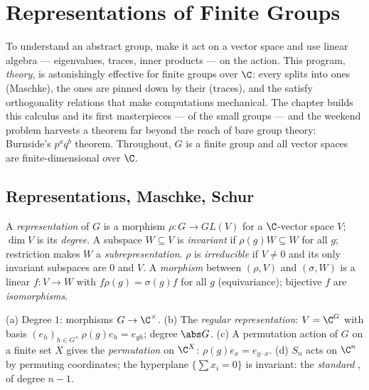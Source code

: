 \chapter{Representations of Finite Groups}\label{ch:b3:representations}

To understand an abstract group, make it act on a vector space
and use linear algebra --- eigenvalues, traces, inner products ---
on the action. This program, \emph{ theory}, is
astonishingly effective for finite groups over $\C$: every
 splits into  ones (Maschke), the
 ones are pinned down by their \emph{}
(traces), and the  satisfy orthogonality relations that
make computations mechanical. The chapter builds this calculus
and its first masterpieces ---  of the small
groups --- and the weekend problem harvests a theorem far beyond
the reach of bare group theory: Burnside's $p^aq^b$ theorem.
Throughout, $G$ is a finite group and all vector spaces are
finite-dimensional over $\C$.

\section{Representations, Maschke, Schur}

\begin{definition}\label{def:b3:representations:rep}
A \emph{representation} of $G$ is a
morphism $\rho \colon G \to GL(V)$ for a $\C$-vector space $V$;
$\dim V$ is its \emph{degree}. A subspace $W \subseteq V$ is
\emph{invariant} if $\rho(g)W \subseteq W$ for all $g$;
restriction makes $W$ a \emph{subrepresentation}. $\rho$ is
\emph{irreducible} if $V \neq
0$ and its only invariant subspaces are $0$ and $V$. A
\emph{morphism} between $(\rho, V)$ and $(\sigma, W)$ is a linear
$f\colon V \to W$ with $f\rho(g) = \sigma(g)f$ for all $g$
(equivariance); bijective $f$ are \emph{isomorphisms}.
\end{definition}

\begin{example}\label{ex:b3:representations:examples}
(a) Degree $1$: morphisms $G \to \C^\times$.
(b) The \emph{regular representation}: $V = \C^G$ with basis $(e_h)_{h \in G}$,
$\rho(g)e_h = e_{gh}$; degree $\abs G$.
(c) A permutation action of $G$ on a finite set $X$ gives the
\emph{permutation } on $\C^X$: $\rho(g)e_x =
e_{g\cdot x}$.
(d) $S_n$ acts on $\C^n$ by permuting coordinates; the hyperplane
$\{\sum x_i = 0\}$ is invariant: the \emph{standard
}, of degree $n - 1$.
\end{example}

